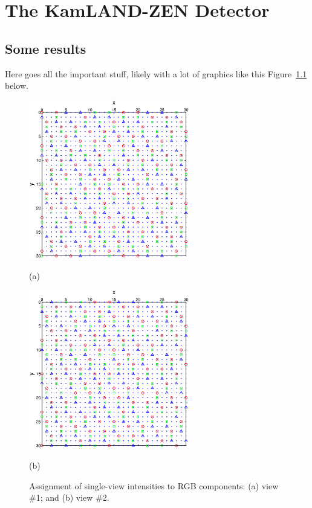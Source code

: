 \chapter{The KamLAND-ZEN Detector}
\label{chapter:klz-detector}
\thispagestyle{myheadings}

\graphicspath{{2_Chapter_KLZ_Detector/Figures/}}

\section{Some results}
\label{sec:results}

Here goes all the important stuff, likely with a lot of graphics like this Figure~\ref{fig:sampling} below.

\begin{figure}[htb]
  \begin{minipage}[t]{0.49\linewidth}\centering
    \includegraphics[width=7cm]{figure_sampling_view1.eps}
    \medskip
    \centerline{(a)}
  \end{minipage}\hfill
  \begin{minipage}[t]{0.49\linewidth}\centering
    \includegraphics[width=7cm]{figure_sampling_view2.eps}
    \medskip
    \centerline{(b)}
  \end{minipage}
  \caption{Assignment of single-view intensities to RGB components: (a) view
    \#1; and (b) view \#2. }
  \label{fig:sampling}
\end{figure}

